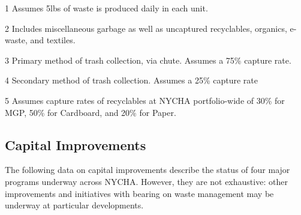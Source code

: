 \begin{table}[H]
\begin{threeparttable}
\small



\end{threeparttable}
\end{table}
\pagebreak
\begin{table}[H]
\begin{threeparttable}
\small



\begin{tablenotes}
\item [1] Assumes 5lbs of waste is produced daily in each unit.
\item [2] Includes miscellaneous garbage as well as uncaptured recyclables, organics, e-waste, and textiles.
\item [3] Primary method of trash collection, via chute. Assumes a 75\% capture rate.
\item [4] Secondary method of trash collection. Assumes a 25\% capture rate
\item [5] Assumes capture rates of recyclables at NYCHA portfolio-wide of 30\% for MGP, 50\% for Cardboard, and 20\% for Paper. 
\end{tablenotes}
\end{threeparttable}
\end{table}


\pagebreak

\textcolor{ccorange}{\section{Capital Improvements}}

The following data on capital improvements describe the status of four major programs underway across NYCHA. However, they are not exhaustive: other improvements and initiatives with bearing on waste management may be underway at particular developments.
\begin{table}[H]
\small
\begin{tabular}{l}
\\

\end{tabular}
\end{table}
\pagebreak

